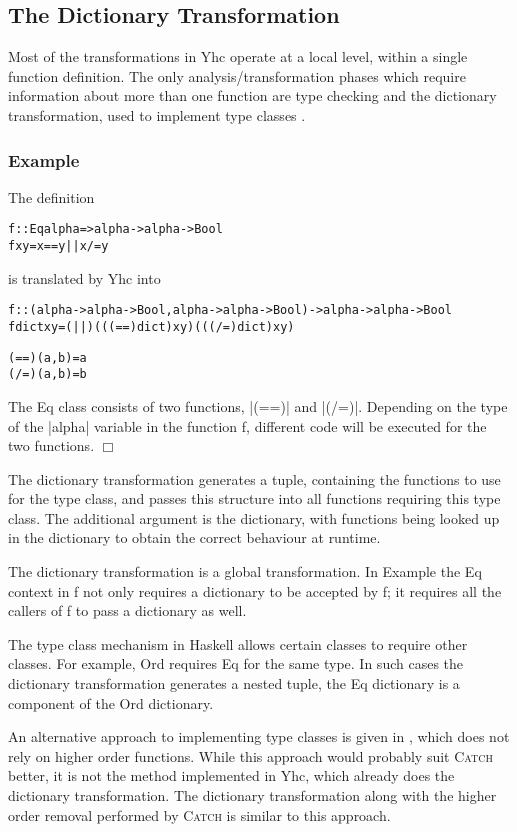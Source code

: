 \documentclass[preprint]{sigplanconf}
\newcommand{\C}[1]{\textsf{#1}}
\newcommand{\catch}{\textsc{Catch}}
\newcounter{exmp}
\newcommand{\yesexample}{\subsubsection*{Example \arabic{exmp}}\addtocounter{exmp}{1}}
\newcommand{\noexample}{\hfill$\Box$}
\newcommand{\lastexample}{\arabic{exmp}}
\newenvironment{code}{\begin{alltt}\small}{\end{alltt}}
\newenvironment{example}{\yesexample}{\noexample}
\begin{document}
\subsection{The Dictionary Transformation}
\label{sec:dict}

Most of the transformations in Yhc operate at a local level, within a single function definition. The only analysis/transformation phases which require information about more than one function are type checking and the dictionary transformation, used to implement type classes \citep{wadler:type_classes}.

\begin{example}
The definition

\begin{code}
f :: Eq alpha => alpha -> alpha -> Bool
f x y = x == y || x /= y
\end{code}

\noindent is translated by Yhc into

\begin{code}
f :: (alpha -> alpha -> Bool, alpha -> alpha -> Bool) -> alpha -> alpha -> Bool
f dict x y = (||) (((==) dict) x y) (((/=) dict) x y)

(==) (a,b) = a
(/=) (a,b) = b
\end{code}

The \C{Eq} class consists of two functions, |(==)| and |(/=)|. Depending on the type of the |alpha| variable in the function \C{f}, different code will be executed for the two functions.
\end{example}

The dictionary transformation generates a tuple, containing the functions to use for the type class, and passes this structure into all functions requiring this type class. The additional argument is the dictionary, with functions being looked up in the dictionary to obtain the correct behaviour at runtime.

The dictionary transformation is a global transformation. In Example \lastexample{} the \C{Eq} context in \C{f} not only requires a dictionary to be accepted by \C{f}; it requires all the callers of \C{f} to pass a dictionary as well.

The type class mechanism in Haskell allows certain classes to require other classes. For example, \C{Ord} requires \C{Eq} for the same type. In such cases the dictionary transformation generates a nested tuple, the \C{Eq} dictionary is a component of the \C{Ord} dictionary.

An alternative approach to implementing type classes is given in \cite{jones:dictionary_free}, which does not rely on higher order functions. While this approach would probably suit \catch{} better, it is not the method implemented in Yhc, which already does the dictionary transformation. The dictionary transformation along with the higher order removal performed by \catch{} is similar to this approach.
\end{document}
